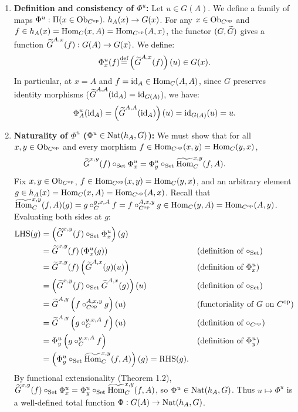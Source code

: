 \documentclass[10pt,a4paper]{article}
\begin{document}
\begin{enumerate}
\item \textbf{Definition and consistency of $\Phi^u$:}
Let $u \in G(A)$. We define a family of maps $\Phi^u : \Pi(x \in {\textrm{Ob}}_{C^{\textrm{op}}}).\ h_A(x) \to G(x)$.
For any $x \in {\textrm{Ob}}_{C^{\textrm{op}}}$ and $f \in h_A(x) = {\textrm{Hom}}_C(x,A) = {\textrm{Hom}}_{C^{\textrm{op}}}(A,x)$, the functor $(G, {\widetilde{G}\textrm{}})$ gives a function ${\widetilde{G}\textrm{}}^{A,x}(f) : G(A) \to G(x)$. We define:
$$\Phi^u_x(f) {\stackrel{{\textrm{def}}}{=}} \left({\widetilde{G}\textrm{}}^{A,x}(f)\right)(u) \in G(x).$$
In particular, at $x = A$ and $f = {\textrm{id}}_A \in {\textrm{Hom}}_C(A,A)$, since $G$ preserves identity morphisms (${\widetilde{G}\textrm{}}^{A,A}({\textrm{id}}_A) = {\textrm{id}}_{G(A)}$), we have:
$$\Phi^u_A({\textrm{id}}_A) = \left({\widetilde{G}\textrm{}}^{A,A}({\textrm{id}}_A)\right)(u) = {\textrm{id}}_{G(A)}(u) = u.$$

\item \textbf{Naturality of $\Phi^u$ ($\Phi^u \in {\textrm{Nat}}(h_A, G)$):}
We must show that for all $x, y \in {\textrm{Ob}}_{C^{\textrm{op}}}$ and every morphism $f \in {\textrm{Hom}}_{C^{\textrm{op}}}(x,y) = {\textrm{Hom}}_C(y,x)$,
$${\widetilde{G}\textrm{}}^{x,y}(f) \circ_{\textrm{Set}} \Phi^u_x = \Phi^u_y \circ_{\textrm{Set}} {\widetilde{{\textrm{Hom}}}\textrm{}}_C^{x,y}(f,A).$$
Fix $x, y \in {\textrm{Ob}}_{C^{\textrm{op}}}$, $f \in {\textrm{Hom}}_{C^{\textrm{op}}}(x,y) = {\textrm{Hom}}_C(y,x)$, and an arbitrary element $g \in h_A(x) = {\textrm{Hom}}_C(x,A) = {\textrm{Hom}}_{C^{\textrm{op}}}(A,x)$.
Recall that ${\widetilde{{\textrm{Hom}}}\textrm{}}_C^{x,y}(f,A)(g) = g \circ_C^{y,x,A} f = f \circ_{C^{\textrm{op}}}^{A,x,y} g \in {\textrm{Hom}}_C(y,A) = {\textrm{Hom}}_{C^{\textrm{op}}}(A,y)$.
Evaluating both sides at $g$:
\begin{align*}
\textrm{LHS}(g) &= \left({\widetilde{G}\textrm{}}^{x,y}(f) \circ_{\textrm{Set}} \Phi^u_x\right)(g) \\
&= {\widetilde{G}\textrm{}}^{x,y}(f)\left(\Phi^u_x(g)\right) && \text{(definition of $\circ_{\textrm{Set}}$)} \\
&= {\widetilde{G}\textrm{}}^{x,y}(f)\left({\widetilde{G}\textrm{}}^{A,x}(g)(u)\right) && \text{(definition of $\Phi^u_x$)} \\
&= \left({\widetilde{G}\textrm{}}^{x,y}(f) \circ_{\textrm{Set}} {\widetilde{G}\textrm{}}^{A,x}(g)\right)(u) && \text{(definition of $\circ_{\textrm{Set}}$)} \\
&= {\widetilde{G}\textrm{}}^{A,y}\left(f \circ_{C^{\textrm{op}}}^{A,x,y} g\right)(u) && \text{(functoriality of $G$ on $C^{\textrm{op}}$)} \\
&= {\widetilde{G}\textrm{}}^{A,y}\left(g \circ_C^{y,x,A} f\right)(u) && \text{(definition of $\circ_{C^{\textrm{op}}}$)} \\
&= \Phi^u_y\left(g \circ_C^{y,x,A} f\right) && \text{(definition of $\Phi^u_y$)} \\
&= \left(\Phi^u_y \circ_{\textrm{Set}} {\widetilde{{\textrm{Hom}}}\textrm{}}_C^{x,y}(f,A)\right)(g) = \textrm{RHS}(g).
\end{align*}
By functional extensionality (Theorem 1.2), ${\widetilde{G}\textrm{}}^{x,y}(f) \circ_{\textrm{Set}} \Phi^u_x = \Phi^u_y \circ_{\textrm{Set}} {\widetilde{{\textrm{Hom}}}\textrm{}}_C^{x,y}(f,A)$, so $\Phi^u \in {\textrm{Nat}}(h_A, G)$. Thus $u \mapsto \Phi^u$ is a well-defined total function $\Phi : G(A) \to {\textrm{Nat}}(h_A, G)$.


\end{enumerate}
\end{document}
